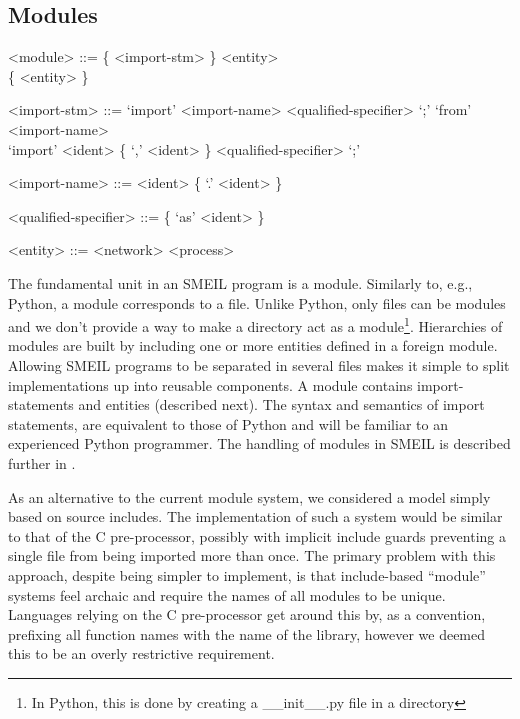 \setlength{\grammarindent}{10em} %

\subsection{Modules}
\begin{grammar}
  <module> ::= \{ <import-stm> \} <entity> \\ \{ <entity> \}

  <import-stm> ::= `import' <import-name> <qualified-specifier> `;'
  \alt `from' <import-name> \\ `import' <ident> \{ `,' <ident> \} <qualified-specifier>
  `;'

  <import-name> ::= <ident> \{ `.' <ident> \}

  <qualified-specifier> ::= \{ `as' <ident> \}

  <entity> ::= <network>
  \alt <process>
\end{grammar}


The fundamental unit in an SMEIL program is a {\ttfamily module}. Similarly to,
e.g., Python, a module corresponds to a file. Unlike Python, only files can be
modules and we don't provide a way to make a directory act as a
module\footnote{In Python, this is done by creating a {\ttfamily
    \_\_init\_\_.py} file in a directory}. Hierarchies of modules are built by
including one or more entities defined in a foreign module. Allowing SMEIL
programs to be separated in several files makes it simple to split
implementations up into reusable components. A module contains import-statements
and entities (described next). The syntax and semantics of import statements,
are equivalent to those of Python and will be familiar to an experienced Python
programmer. The handling of modules in SMEIL is described further in
.

As an alternative to the current module system, we considered a model simply
based on source includes. The implementation of such a system would be similar
to that of the C pre-processor, possibly with implicit include guards preventing
a single file from being imported more than once. The primary problem with this
approach, despite being simpler to implement, is that include-based ``module''
systems feel archaic and require the names of all modules to be
unique. Languages relying on the C pre-processor get around this by, as a
convention, prefixing all function names with the name of the library, however
we deemed this to be an overly restrictive requirement.


